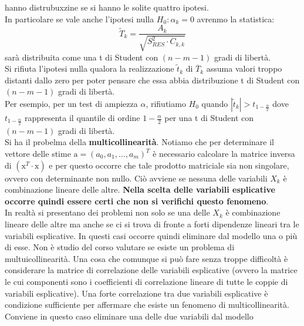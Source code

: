 \documentclass[a4paper,12pt, oneside]{book}
\begin{document}
hanno distrubuxzine se si hanno le solite quattro ipotesi.\\
In particolare se vale anche l'ipotesi nulla $H_{0} : \alpha_{k}=0$ avrenmo la statistica:
\[\tilde{T}_{k}=\frac{A_{k}}{\sqrt{S_{R E S}^{2} \cdot C_{k, k}}}\]
sarà distribuita come una t di Student con $(n-m-1)$ gradi di libertà.\\
Si rifiuta l'ipotesi nulla qualora la realizzazione $\tilde{t}_{k} \text { di } \overline{T}_{k}$ assuma
valori troppo distanti dallo zero per poter pensare che essa abbia distribuzione t di Student
con $(n-m-1)$ gradi di libertà.\\
Per esempio, per un test di ampiezza $\alpha$, rifiutiamo $H_0$ quando $\left|\tilde{t}_{k}\right|>t_{1-\frac{\alpha}{2}}$ dove $t_{1-\frac{\alpha}{2}}$ rappresenta il quantile di ordine $1-\frac{\alpha}{2}$ per una t di Student con $(n-m-1)$ gradi di libertà.\\
Si ha il probelma della \textbf{multicollinearità}. Notiamo che per determinare il vettore delle stime
 $\mathrm{a}=\left(a_{0}, a_{1}, \ldots, a_{m}\right)^{T}$ è necessario calcolare la matrice inversa di $\left(\mathrm{x}^{T} \cdot \mathrm{x}\right)$ e per questo occorre che tale prodotto matriciale sia non singolare, ovvero con
determinante non nullo.
Ciò avviene se nessuna delle variabili $X_k$ è combinazione lineare delle altre. \textbf{Nella scelta delle variabili esplicative occorre quindi essere certi che non si verifichi questo fenomeno}.\\
In realtà si presentano dei problemi non solo se una delle $X_k$ è combinazione lineare
delle altre ma anche se ci si trova di fronte a forti dipendenze lineari tra le variabili
esplicative.
In questi casi occorre quindi eliminare dal modello una o più di esse. Non è studio del corso valutare se esiste un problema di multuicollinearità. Una cosa che comunque si può fare senza troppe difficoltà è considerare la matrice di
correlazione delle variabili esplicative (ovvero la matrice le cui componenti sono i
coefficienti di correlazione lineare di tutte le coppie di variabili esplicative).
Una forte correlazione tra due variabili esplicative è condizione sufficiente per
affermare che esiste un fenomeno di multicollinearità.
Conviene in questo caso eliminare una delle due variabili dal modello
\end{document}

